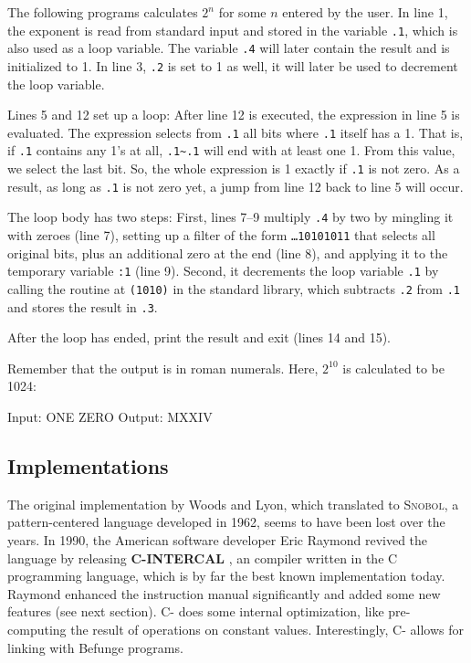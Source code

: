 The following programs calculates $2^n$ for some $n$ entered by the user. In line 1, the exponent is read from standard input and stored in the variable \texttt{.1}, which is also used as a loop variable. The variable \texttt{.4} will later contain the result and is initialized to 1. In line 3, \texttt{.2} is set to 1 as well, it will later be used to decrement the loop variable.

Lines 5 and 12 set up a loop: After line 12 is executed, the expression in line 5 is evaluated. The expression selects from \texttt{.1} all bits where \texttt{.1} itself has a 1. That is, if \texttt{.1} contains any 1's at all, \texttt{.1\~{}.1} will end with at least one 1. From this value, we select the last bit. So, the whole expression is 1 exactly if \texttt{.1} is not zero. As a result, as long as \texttt{.1} is not zero yet, a jump from line 12 back to line 5 will occur.

The loop body has two steps: First, lines 7--9 multiply \texttt{.4} by two by mingling it with zeroes (line 7), setting up a filter of the form \texttt{\dots10101011} that selects all original bits, plus an additional zero at the end (line 8), and applying it to the temporary variable \texttt{:1} (line 9). Second, it decrements the loop variable \texttt{.1} by calling the routine at \texttt{(1010)} in the standard library, which subtracts \texttt{.2} from \texttt{.1} and stores the result in \texttt{.3}.

After the loop has ended, print the result and exit (lines 14 and 15).



Remember that the output is in roman numerals. Here, $2^{10}$ is calculated to be 1024:

\begin{io}
Input: ONE ZERO
Output: MXXIV
\end{io}

\subsection{Implementations}

The original implementation by Woods and Lyon, which translated \ic{} to \textsc{Snobol}, a pattern-centered language developed in 1962, seems to have been lost over the years. In 1990, the American software developer Eric Raymond revived the language by releasing \textbf{C-INTERCAL} \cite{raymond_intercal}, an \ic{} compiler written in the C programming language, which is by far the best known implementation today. Raymond enhanced the instruction manual \cite{raymond2010cintercal} significantly and added some new features (see next section). C-\ic{} does some internal optimization, like pre-computing the result of operations on constant values. Interestingly, C-\ic{} allows for linking with Befunge programs.

